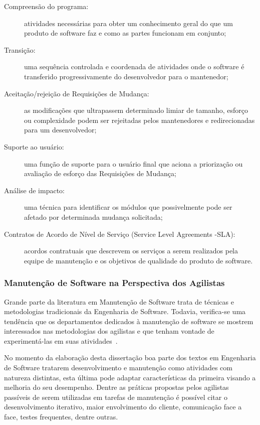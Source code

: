 \begin{description}
	\item[Compreensão do programa:] atividades necessárias para obter um
		conhecimento geral do que um produto de software faz e como as partes
		funcionam em conjunto;
	\item[Transição:] uma sequência controlada e coordenada de atividades onde o
		software é transferido progressivamente do desenvolvedor para o
		mantenedor;
	\item[Aceitação/rejeição de Requisições de Mudança:] as modificações
		que ultrapassem determinado limiar de tamanho, esforço ou complexidade
		podem ser rejeitadas pelos mantenedores e redirecionadas para um
		desenvolvedor;
	\item[Suporte ao usuário:] uma função de suporte para o usuário final que
		aciona a priorização ou avaliação de esforço das Requisições
		de Mudança;
	\item[Análise de impacto:] uma técnica para identificar os módulos que
		possivelmente pode ser afetado por determinada mudança solicitada;
	\item[Contratos de Acordo de Nível de Serviço (Service Level Agreements
		\@-\@ SLA):] acordos contratuais que descrevem os serviços a serem
		realizados pela equipe de manutenção e os objetivos de qualidade do
		produto de software.
\end{description}
\todoend{}

\subsubsection{Manutenção de Software na Perspectiva dos Agilistas}
\label{sub:manutenção_de_software_com_método_dos_agilistas}

Grande parte da literatura em Manutenção de Software trata de técnicas e
metodologias tradicionais da Engenharia de Software. Todavia, verifica-se uma
tendência que os departamentos dedicados à manutenção de software se mostrem
interessados nas metodologias dos agilistas e que tenham vontade de
experimentá-las em suas atividades~\cite{Heeager2015}.

No momento da elaboração desta dissertação boa parte dos textos em Engenharia de
Software tratarem desenvolvimento e manutenção como atividades com natureza
distintas, esta última pode adaptar características da primeira visando a
melhoria do seu desempenho. Dentre as práticas propostas pelos agilistas
passíveis de serem utilizadas em tarefas de manutenção é possível citar o
desenvolvimento iterativo, maior envolvimento do cliente, comunicação face a
face, testes frequentes, dentre outras.

